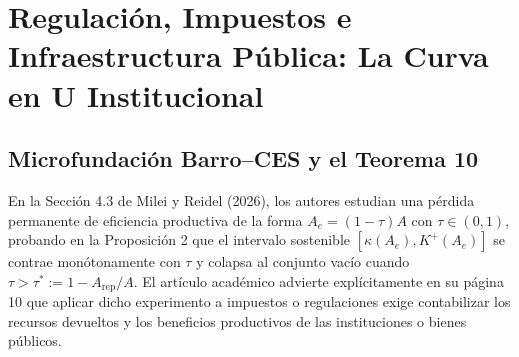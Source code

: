\documentclass[11pt,letterpaper]{article}
\theoremstyle{plain}
\begin{document}
\section{Regulación, Impuestos e Infraestructura Pública: La Curva en U Institucional}

\subsection{Microfundación Barro--CES y el Teorema 10}

En la Sección 4.3 de Milei y Reidel (2026), los autores estudian una pérdida permanente de eficiencia productiva de la forma $A_e=(1-\tau)A$ con $\tau\in(0,1)$, probando en la Proposición 2 que el intervalo sostenible $[\kappa(A_e),K^+(A_e)]$ se contrae monótonamente con $\tau$ y colapsa al conjunto vacío cuando $\tau > \tau^* := 1-A_{\mathrm{rep}}/A$. El artículo académico advierte explícitamente en su página 10 que aplicar dicho experimento a impuestos o regulaciones exige contabilizar los recursos devueltos y los beneficios productivos de las instituciones o bienes públicos.
\end{document}
